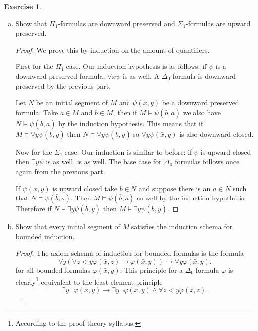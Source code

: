 \documentclass{article}
\theoremstyle{definition}
\newtheorem{question}{Exercise}
\begin{document}
\begin{question}
\begin{enumerate}[(a)]
        \item Show that \(\Pi_{1}\)-formulas are downward preserved and
              \(\Sigma_{1}\)-formulas are upward preserved.

              \begin{proof}
                  We prove this by induction on the amount of quantifiers.

                  First for the \(\Pi_{1}\) case. Our induction hypothesis is as
                  follows: if \(\psi\) is a downward preserved formula,
                  \(\forall x\psi\) is as well. A \(\Delta_{0}\) formula is
                  downward preserved by the previous part.

                  Let \(N\) be an initial segment of \(M\) and
                  \(\psi(\bar{x},y)\) be a downward preserved formula. Take
                  \(a\in M\) and \(\bar{b}\in M\), then if
                  \(M\models\psi(\bar{b},a)\) we also have
                  \(N\models\psi(\bar{b},a)\) by the induction hypothesis. This
                  means that if \(M\models\forall y\psi(\bar{b},y)\) then
                  \(N\models\forall y\psi(\bar{b},y)\) so \(\forall
                  y\psi(\bar{x},y)\) is also downward closed.

                  Now for the \(\Sigma_{1}\) case. Our induction is similar to
                  before: if \(\psi\) is upward closed then \(\exists y\psi\) is
                  as well. is as well. The base case for \(\Delta_{0}\) formulas
                  follows once again from the previous part.

                  If \(\psi(\bar{x},y)\) is upward closed take \(\bar{b}\in N\)
                  and suppose there is an \(a\in N\) such that
                  \(N\models\psi(\bar{b},a)\). Then \(M\models\psi(\bar{b},a)\)
                  as well by the induction hypothesis. Therefore if
                  \(N\models\exists y\psi(\bar{b},y)\) then \(M\models\exists
                  y\psi(\bar{b},y)\).
              \end{proof}

        \item Show that every initial segment of \(M\) satisfies the induction
              schema for bounded induction.

              \begin{proof}
                  The axiom schema of induction for bounded formulas is the
                  formula
                  \[
                      \forall y(\forall z<y\varphi(\bar{x},z)\to\varphi(\bar{x},y))\to\forall y\varphi(\bar{x},y).
                  \]
                  for all bounded formulas \(\varphi(\bar{x},y)\). This
                  principle for a \(\Delta_{0}\) formula \(\varphi\) is
                  clearly\footnote{According to the proof theory syllabus.}
                  equivalent to the least element principle
                  \[
                      \exists y\neg\varphi(\bar{x},y)\to\exists y\neg\varphi(\bar{x},y)\wedge\forall z<y\varphi(\bar{x},z).
                  \]


\end{proof}
\end{enumerate}
\end{question}
\end{document}

